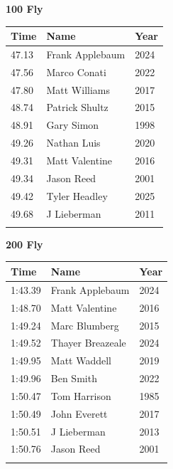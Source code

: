 \vspace{1.2em}
\noindent\begin{minipage}[t]{0.48\textwidth}
\centering
\textbf{\textcolor{teamprimary}{100 Fly}}\par
\vspace{0.5em}
\centering
\small
\renewcommand{\arraystretch}{1.0}
\setlength{\tabcolsep}{4pt}
\begin{tabular}{@{}p{1.8cm}p{3.0cm}p{1.0cm}@{}}
\toprule
\textbf{Time} & \textbf{Name} & \textbf{Year} \\
\midrule
47.13 & Frank Applebaum & 2024 \\
47.56 & Marco Conati & 2022 \\
47.80 & Matt Williams & 2017 \\
48.74 & Patrick Shultz & 2015 \\
48.91 & Gary Simon & 1998 \\
49.26 & Nathan Luis & 2020 \\
49.31 & Matt Valentine & 2016 \\
49.34 & Jason Reed & 2001 \\
49.42 & Tyler Headley & 2025 \\
49.68 & J Lieberman & 2011 \\
\bottomrule
\vspace{0.5em}
\end{tabular}
\end{minipage}
\hfill
\begin{minipage}[t]{0.48\textwidth}
\centering
\textbf{\textcolor{teamprimary}{200 Fly}}\par
\vspace{0.5em}
\centering
\small
\renewcommand{\arraystretch}{1.0}
\setlength{\tabcolsep}{4pt}
\begin{tabular}{@{}p{1.8cm}p{3.0cm}p{1.0cm}@{}}
\toprule
\textbf{Time} & \textbf{Name} & \textbf{Year} \\
\midrule
1:43.39 & Frank Applebaum & 2024 \\
1:48.70 & Matt Valentine & 2016 \\
1:49.24 & Marc Blumberg & 2015 \\
1:49.52 & Thayer Breazeale & 2024 \\
1:49.95 & Matt Waddell & 2019 \\
1:49.96 & Ben Smith & 2022 \\
1:50.47 & Tom Harrison & 1985 \\
1:50.49 & John Everett & 2017 \\
1:50.51 & J Lieberman & 2013 \\
1:50.76 & Jason Reed & 2001 \\
\bottomrule
\vspace{0.5em}
\end{tabular}
\end{minipage}
